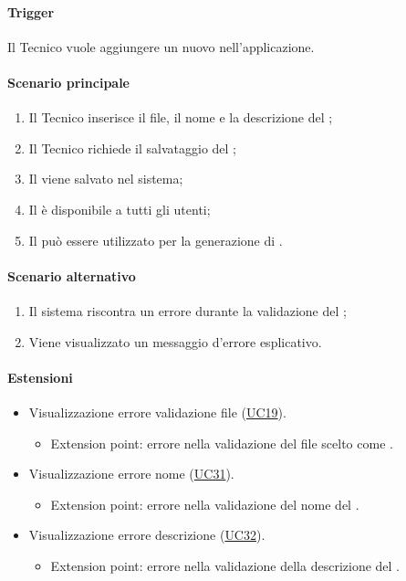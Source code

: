 \paragraph*{Trigger}
Il Tecnico vuole aggiungere un nuovo  nell'applicazione.

\paragraph*{Scenario principale}
\begin{enumerate}
  \item Il Tecnico inserisce il file, il nome e la descrizione del ;
  \item Il Tecnico richiede il salvataggio del ;
  \item Il  viene salvato nel sistema;
  \item Il  è disponibile a tutti gli utenti;
  \item Il  può essere utilizzato per la generazione di .
\end{enumerate}

\paragraph*{Scenario alternativo}
\begin{enumerate}
  \item Il sistema riscontra un errore durante la validazione del ;
  \item Viene visualizzato un messaggio d'errore esplicativo.
\end{enumerate}

\paragraph*{Estensioni}
\begin{itemize}
  \item Visualizzazione errore validazione file (\hyperref[UC19]{UC19}).
  \begin{itemize}
    \item Extension point: errore nella validazione del file scelto come .
  \end{itemize}
  \item Visualizzazione errore nome  (\hyperref[UC31]{UC31}).
  \begin{itemize}
    \item Extension point: errore nella validazione del nome del .
  \end{itemize}
  \item Visualizzazione errore descrizione  (\hyperref[UC32]{UC32}).
  \begin{itemize}
    \item Extension point: errore nella validazione della descrizione del .
  \end{itemize}
\end{itemize}
